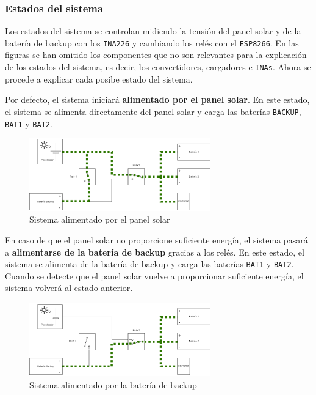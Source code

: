 \subsubsection{Estados del sistema}\label{subsubsec:estados}

Los estados del sistema se controlan midiendo la tensión del panel solar y de la batería de backup con los \texttt{INA226} y cambiando los relés con el \texttt{ESP8266}. En las figuras se han omitido los componentes que no son relevantes para la explicación de los estados del sistema, es decir, los convertidores, cargadores e \texttt{INAs}. Ahora se procede a explicar cada posibe estado del sistema.

Por defecto, el sistema iniciará \textbf{alimentado por el panel solar}. En este estado, el sistema se alimenta directamente del panel solar y carga las baterías \texttt{BACKUP}, \texttt{BAT1} y \texttt{BAT2}.

\begin{figure}[H]
    \centering
    \includegraphics[width=0.7\textwidth]{images/2-hardware/Estado_solar.png}
    \caption{Sistema alimentado por el panel solar}
    \label{fig:hardware/estados/solar}
\end{figure}

En caso de que el panel solar no proporcione suficiente energía, el sistema pasará a \textbf{alimentarse de la batería de backup} gracias a los relés. En este estado, el sistema se alimenta de la batería de backup y carga las baterías \texttt{BAT1} y \texttt{BAT2}. Cuando se detecte que el panel solar vuelve a proporcionar suficiente energía, el sistema volverá al estado anterior.

\begin{figure}[H]
    \centering
    \includegraphics[width=0.7\textwidth]{images/2-hardware/Estado_backup.png}
    \caption{Sistema alimentado por la batería de backup}
    \label{fig:hardware/estados/backup}
\end{figure}

